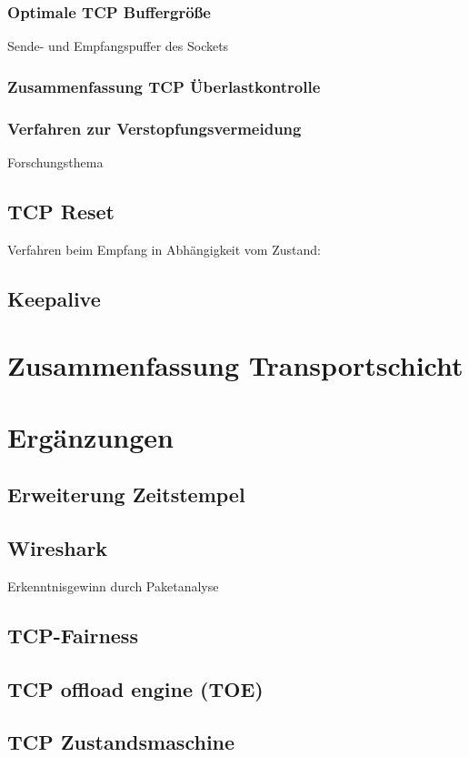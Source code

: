 \subsubsection{Optimale TCP Buffergröße}
Sende- und Empfangspuffer des Sockets
\subsubsection{Zusammenfassung TCP Überlastkontrolle}
\subsubsection{Verfahren zur Verstopfungsvermeidung}
Forschungsthema

\subsection{TCP Reset}
Verfahren beim Empfang in Abhängigkeit vom Zustand:

\subsection{Keepalive}

\section{Zusammenfassung Transportschicht}

\section{Ergänzungen}
\subsection{Erweiterung Zeitstempel}
\subsection{Wireshark}
Erkenntnisgewinn durch Paketanalyse
\subsection{TCP-Fairness}
\subsection{TCP offload engine (TOE)}
\subsection{TCP Zustandsmaschine}
